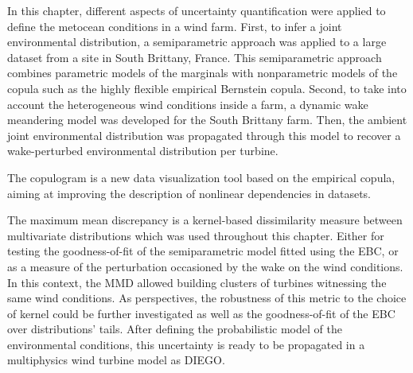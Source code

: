 In this chapter, different aspects of uncertainty quantification were applied to define the metocean conditions in a wind farm. 
First, to infer a joint environmental distribution, a semiparametric approach was applied to a large dataset from a site in South Brittany, France. 
This semiparametric approach combines parametric models of the marginals with nonparametric models of the copula such as the highly flexible empirical Bernstein copula.  
Second, to take into account the heterogeneous wind conditions inside a farm, a dynamic wake meandering model was developed for the South Brittany farm. 
Then, the ambient joint environmental distribution was propagated through this model to recover a wake-perturbed environmental distribution per turbine.  

The copulogram is a new data visualization tool based on the empirical copula, aiming at improving the description of nonlinear dependencies in datasets.  

The maximum mean discrepancy is a kernel-based dissimilarity measure between multivariate distributions which was used throughout this chapter. 
Either for testing the goodness-of-fit of the semiparametric model fitted using the EBC, or as a measure of the perturbation occasioned by the wake on the wind conditions. 
In this context, the MMD allowed building clusters of turbines witnessing the same wind conditions. 
As perspectives, the robustness of this metric to the choice of kernel could be further investigated as well as the goodness-of-fit of the EBC over distributions' tails. 
After defining the probabilistic model of the environmental conditions, this uncertainty is ready to be propagated in a multiphysics wind turbine model as DIEGO. 
